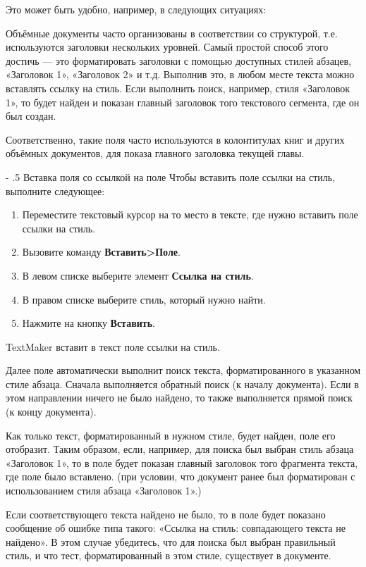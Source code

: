 ﻿\documentclass[a4paper,10pt]{article}
\makeatletter
\renewcommand\paragraph{%
   \@startsection{paragraph}{4}{0mm}%
      {-\baselineskip}%
      {.5\baselineskip}%
      {\normalfont\normalsize\bfseries}}
\makeatother
\begin{document}
Это может быть удобно, например, в следующих ситуациях:

Объёмные документы часто организованы в соответствии со структурой, т.е. используются заголовки нескольких уровней. Самый простой способ этого достичь — это форматировать заголовки с помощью доступных стилей абзацев, «Заголовок 1», «Заголовок 2» и т.д. Выполнив это, в любом месте текста можно вставлять ссылку на стиль. Если выполнить поиск, например, стиля «Заголовок 1», то будет найден и показан главный заголовок того текстового сегмента, где он был создан.

Соответственно, такие поля часто используются в колонтитулах книг и других объёмных документов, для показа главного заголовка текущей главы.

\paragraph{Вставка поля со ссылкой на поле}
Чтобы вставить поле ссылки на стиль, выполните следующее:
\begin{enumerate}
 \item Переместите текстовый курсор на то место в тексте, где нужно вставить поле ссылки на стиль.
 \item Вызовите команду \textbf{Вставить>Поле}.
 \item В левом списке выберите элемент \textbf{Ссылка на стиль}.
 \item В правом списке выберите стиль, который нужно найти.
 \item Нажмите на кнопку \textbf{Вставить}.
\end{enumerate}

TextMaker вставит в текст поле ссылки на стиль.

Далее поле автоматически выполнит  поиск текста, форматированного в указанном стиле абзаца. Сначала выполняется обратный поиск (к началу документа). Если в этом направлении ничего не было найдено, то также выполняется прямой поиск (к концу документа).

Как только текст, форматированный в нужном стиле, будет найден, поле его отобразит. Таким образом, если, например, для поиска был выбран стиль абзаца «Заголовок 1», то в поле будет показан главный заголовок того фрагмента текста, где поле было вставлено. (при условии, что документ ранее был форматирован с использованием стиля абзаца «Заголовок 1».)

Если соответствующего текста найдено не было, то в поле будет показано сообщение об ошибке типа такого: «Ссылка на стиль: совпадающего текста не найдено». В этом случае убедитесь, что для поиска был выбран правильный стиль, и что тест, форматированный в этом стиле, существует в документе.
\end{document}
